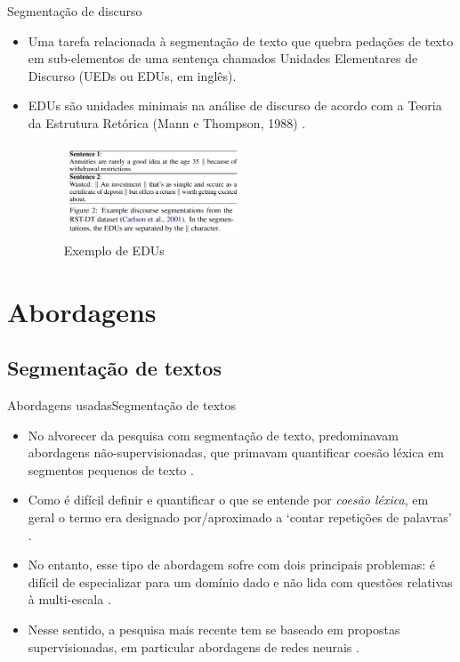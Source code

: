 \documentclass[10pt]{beamer}
\begin{document}
\begin{frame}{Segmentação de discurso}

    \begin{itemize}
        \item Uma tarefa relacionada à segmentação de texto que quebra pedações de texto em sub-elementos de uma sentença chamados Unidades Elementares de Discurso (UEDs ou EDUs, em inglês).
        
        \item EDUs são unidades minimais na análise de discurso de acordo com a Teoria da Estrutura Retórica (Mann e Thompson, 1988) \cite{edus_authors}.
        
        \begin{figure}
        \centering
        \includegraphics[width=0.5\textwidth]{Feathergraphics/edus_example.png}
        \caption{Exemplo de EDUs \cite{attention_google}}
        \label{fig:edus}
    \end{figure}
    
    \end{itemize}
    
\end{frame}

\section{Abordagens}
\subsection{Segmentação de textos}
\begin{frame}{Abordagens usadas}{Segmentação de textos}
    \begin{itemize}
        \item No alvorecer da pesquisa com segmentação de texto, predominavam abordagens não-supervisionadas, que primavam quantificar coesão léxica em segmentos pequenos de texto \cite{attention_google}.
        
        \item Como é difícil definir e quantificar o que se entende por \emph{coesão léxica}, em geral o termo era designado por/aproximado a `contar repetições de palavras' \cite{attention_google}.
        
        \item No entanto, esse tipo de abordagem sofre com dois principais problemas: é difícil de especializar para um domínio dado e não lida com questões relativas à multi-escala \cite{attention_google}.
        
        \item Nesse sentido, a pesquisa mais recente tem se baseado em propostas supervisionadas, em particular abordagens de redes neurais \cite{attention_google}.
    \end{itemize}
\end{frame}
\end{document}

